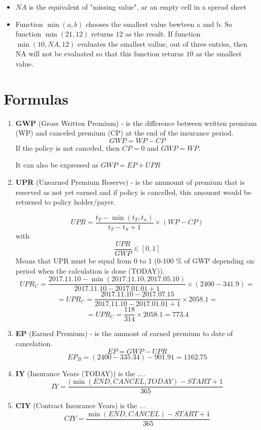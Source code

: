 \documentclass[11pt,a4paper,fleqn]{article}      %
\begin{document}
\begin{itemize}
\item $NA$ is the equivalent of "missing value", ar an empty cell in a spread sheet
\item Function $\min(a,b)$ chooses the smallest value bewteen a and b. So function $\min(21,12)$ returns $12$ as the result. If function $\min(10,NA,12)$ evaluates the smallest vallue, out of three entries, then NA will not be evaluated so that this function returns $10$ as the smallest value. 
\end{itemize}


\section{Formulas}

\begin{enumerate}

\item \textbf{GWP} (Gross Written Premium) - is the difference between written premium (WP) and canceled premium (CP) at the end of the insurance period. $$GWP=WP-CP$$ 
If the policy is not canceled, then $CP=0$ and $GWP=WP$.

It can also be expressed as $GWP=EP+UPR$

\item \textbf{UPR} (Unearned Premium Reserve) - is the ammount of premium that is reserved as not yet earned and if policy is cancelled, this amouont would be returned to policy holder/payer. 

$$UPR=\frac{t_T - \min(t_T,t_n)}{t_T - t_S +1 } \times (WP - CP)$$ 
with $$\frac{UPR}{GWP} \in [0,1]$$ Means that UPR must be equal from 0 to 1 (0-100 \% of GWP depending on period when the calculation is done (TODAY)).
$$UPR_C=\frac{2017.11.10-\min(2017.11.10,2017.05.10)}{2017.11.10-2017.01.01+1} \times (2400-341.9)=$$
$$=UPR_C=\frac{2017.11.10-2017.07.15}{2017.11.10-2017.01.01 +1} \times 2058.1=$$
$$=UPR_C=\frac{118}{314} \times 2058.1=773.4$$

\item \textbf{EP} (Earned Premium) - is the ammont of earned premium to date of cancelation. 
$$EP=GWP-UPR$$
$$EP_B=(2400-335.34)-901.91=1162.75$$


\item \textbf{IY} (Insurance Years (TODAY)) is the .... 
$$IY=\frac{(\min{(END, CANCEL, TODAY)}-START+1}{365}$$


\item \textbf{CIY} (Contract Insurance Years) is the ... 
$$CIY=\frac{\min(END, CANCEL) - START +1}{365}$$




\end{enumerate}
\end{document}
